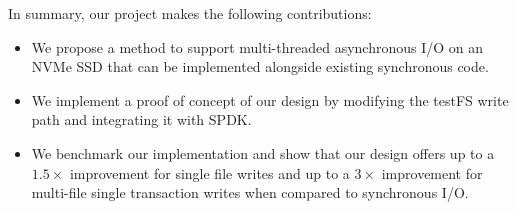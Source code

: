 \vspace{0.75em}
\noindent
In summary, our project makes the following contributions:
\begin{itemize}
  \item We propose a method to support multi-threaded asynchronous I/O on an
    NVMe SSD that can be implemented alongside existing synchronous code.
  \item We implement a proof of concept of our design by modifying the testFS
    write path and integrating it with SPDK.
  \item We benchmark our implementation and show that our design offers up to a
    $1.5\times$ improvement for single file writes and up to a $3\times$
    improvement for multi-file single transaction writes when compared to
    synchronous I/O.
\end{itemize}
